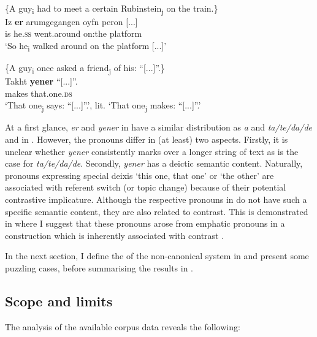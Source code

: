 \documentclass[output=paper
,newtxmath
,modfonts
,nonflat]{langsci/langscibook}
\begin{document}
\ea\label{ex:apel:20}
{ \citep[311]{Prince2006}}\\
\ea\label{ex:apel:20a}
{\{A guy\textsubscript{i} had to meet a certain Rubinstein\textsubscript{j} on the train.\}}\\
\gll Iz \textbf{er} arumgegangen oyfn peron [...]\\
     is he.\textsc{ss} went.around on:the platform \\
\glt ‘So he\textsubscript{i} walked around on the platform [...]’

\ex\label{ex:apel:20b}
{\{A guy\textsubscript{i} once asked a friend\textsubscript{j} of his: “[...]”.\}}\\
\gll Takht \textbf{yener} “[...]”.\\
     makes that.one.\textsc{ds} \\
\glt ‘That one\textsubscript{j} says: “[...]”.’, lit. ‘That one\textsubscript{j} makes: “[...]”.’
\z
\z

At a first glance, \textit{er} and \textit{yener} in  have a similar distribution as \textit{a} and \textit{ta/te/da/de} and in . However, the  pronouns differ in (at least) two aspects. Firstly, it is unclear whether \textit{yener} consistently marks  over a longer string of text as is the case for \textit{ta/te/da/de}. Secondly, \textit{yener} has a deictic semantic content. Naturally, pronouns expressing special deixis ‘this one, that one’ or ‘the other’ are associated with referent switch (or topic change) because of their potential contrastive implicature. Although the respective pronouns in  do not have such a specific semantic content, they are also related to contrast. This is demonstrated in  where I suggest that these pronouns arose from emphatic pronouns in a  construction which is inherently associated with contrast \citep[153]{Givon76}.

In the next section, I define the  of the non-canonical  system in  and present some puzzling cases, before summarising the results in . 

\subsection{Scope and limits}\label{sec:apel:3.2}

The analysis of the available corpus data reveals the following: 
\end{document}
